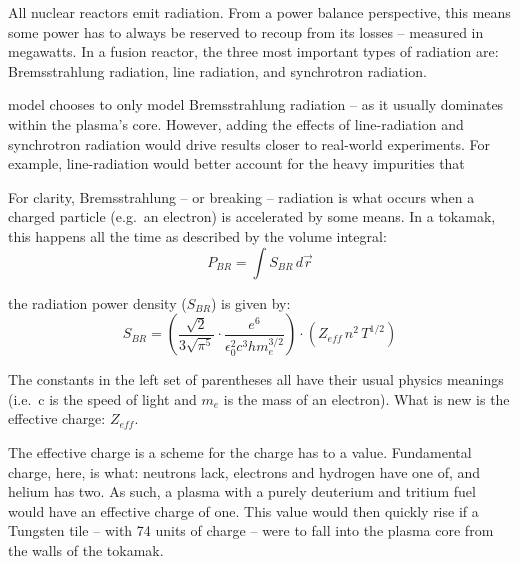 All nuclear reactors emit radiation. From a power balance perspective, this means some power has to always be reserved to recoup from its losses -- measured in megawatts. In a fusion reactor, the three most important types of radiation are: Bremsstrahlung radiation, line radiation, and synchrotron radiation. 

 model chooses to only model Bremsstrahlung radiation -- as it usually dominates within the plasma's core.  However, adding the effects of line-radiation and synchrotron radiation would drive results closer to real-world experiments. For example, line-radiation would better account for the  heavy impurities that 

For clarity, Bremsstrahlung -- or breaking -- radiation is what occurs when a charged particle (e.g.\ an electron) is accelerated by some means. In a tokamak, this happens all the time as   described by the volume integral:
\begin{equation}
	P_{BR} = \int S_{BR} \, d \vec{r}
\end{equation}

 the radiation power density ($S_{BR}$) is given by:
\begin{equation}
	S_{BR} = \left( \frac{\sqrt{2}}{3 \sqrt{\pi^5}} \cdot \frac{e^6}{\epsilon_0^2 c^3 h m_e^{3/2}} \right) \cdot \left( Z_{eff} \, n^2 \, T^{1/2} \right)
\end{equation}

The constants in the left set of parentheses all have their usual physics meanings (i.e.\ c is the speed of light and $m_e$ is the mass of an electron). What is new is the effective charge: $Z_{eff}$.

The effective charge is a scheme for  the charge  has to a  value. Fundamental charge, here, is what: neutrons lack, electrons and hydrogen have one of, and helium has two. As such, a plasma with a purely deuterium and tritium fuel would have an effective charge of one. This value would then quickly rise if a Tungsten tile -- with 74 units of charge -- were to fall into the plasma core from the walls of the tokamak.

